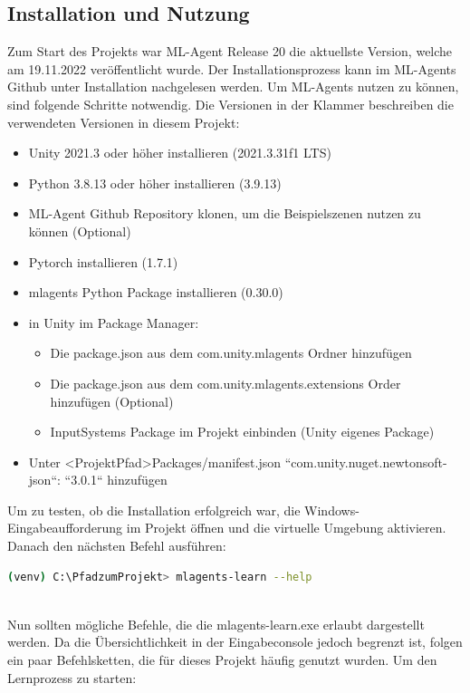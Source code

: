 \subsection{Installation und Nutzung}
Zum Start des Projekts war ML-Agent Release 20 die aktuellste Version, welche am 19.11.2022 veröffentlicht wurde. Der Installationsprozess kann im ML-Agents Github unter Installation\cite{mlagents_install} nachgelesen werden. Um ML-Agents nutzen zu können, sind folgende Schritte notwendig. Die Versionen in der Klammer beschreiben die verwendeten Versionen in diesem Projekt:
\\
\begin{itemize}
	\item Unity 2021.3 oder höher installieren (2021.3.31f1 LTS) 
	\item Python 3.8.13 oder höher installieren (3.9.13)
	\item ML-Agent Github Repository klonen, um die Beispielszenen nutzen zu können (Optional)
	\item Pytorch installieren (1.7.1)
	\item mlagents Python Package installieren (0.30.0)
	\item in Unity im Package Manager:
	\begin{itemize}
		\item Die package.json aus dem com.unity.mlagents Ordner hinzufügen
		\item Die package.json aus dem com.unity.mlagents.extensions Order hinzufügen (Optional)
		\item InputSystems Package im Projekt einbinden (Unity eigenes Package)
	\end{itemize} 	 
	\item Unter <ProjektPfad>Packages/manifest.json “com.unity.nuget.newtonsoft-json“: “3.0.1“ hinzufügen
\end{itemize}
Um zu testen, ob die Installation erfolgreich war, die Windows-Eingabeaufforderung im Projekt öffnen und die virtuelle Umgebung aktivieren. Danach den nächsten Befehl ausführen:
\\
\begin{lstlisting}[language=bash,numbers=none]
	(venv) C:\PfadzumProjekt> mlagents-learn --help
\end{lstlisting}
\noindent
\\
Nun sollten mögliche Befehle, die die mlagents-learn.exe erlaubt dargestellt werden. Da die Übersichtlichkeit in der Eingabeconsole jedoch begrenzt ist, folgen ein paar Befehlsketten, die für dieses Projekt häufig genutzt wurden. Um den Lernprozess zu starten:
